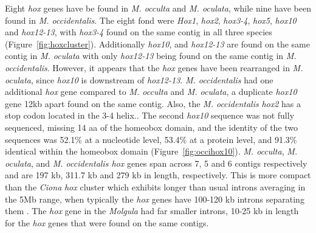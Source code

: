 Eight \textit{hox} genes have be found in \textit{M. occulta} and \textit{M. oculata}, while nine have been found in \textit{M. occidentalis}. The eight fond were \textit{Hox1}, \textit{hox2}, \textit{hox3-4}, \textit{hox5}, \textit{hox10} and \textit{hox12-13}, with \textit{hox3-4} found on the same contig in all three species (Figure~\ref{fig:hoxcluster}). Additionally \textit{hox10}, and \textit{hox12-13} are found on the same contig in \textit{M. oculata} with only \textit{hox12-13} being found on the same contig in \textit{M. occidentalis}. However, it appears that the \textit{hox} genes have been rearranged in \textit{M. oculata}, since \textit{hox10} is downstream of \textit{hox12-13}.  \textit{M. occidentalis} had one additional \textit{hox} gene compared to \textit{M. occulta} and \textit{M. oculata}, a duplicate \textit{hox10} gene \mytilde12kb apart found on the same contig. Also, the \textit{M. occidentalis} \textit{hox2} has a stop codon located in the 3-4 helix.. The second \textit{hox10} sequence was not fully sequenced, missing 14 aa of the homeobox domain, and the identity of the two sequences was 52.1\% at a nucleotide level, 53.4\% at a protein level, and 91.3\% identical within the homeobox domain (Figure~\ref{fig:occihox10}). \textit{M. occulta}, \textit{M. oculata}, and \textit{M. occidentalis hox} genes span across 7, 5 and 6 contigs respectively and are 197 kb, 311.7 kb and 279 kb in length, respectively.  This is more compact than the \textit{Ciona} \textit{hox} cluster which exhibits longer than usual introns averaging in the 5Mb range, when typically the \textit{hox} genes have 100-120 kb introns separating them \cite{mcginnis_homeobox_1992}. The \textit{hox} gene in the \textit{Molgula} had far smaller introns, 10-25 kb in length for the \textit{hox} genes that were found on the same contigs.  

